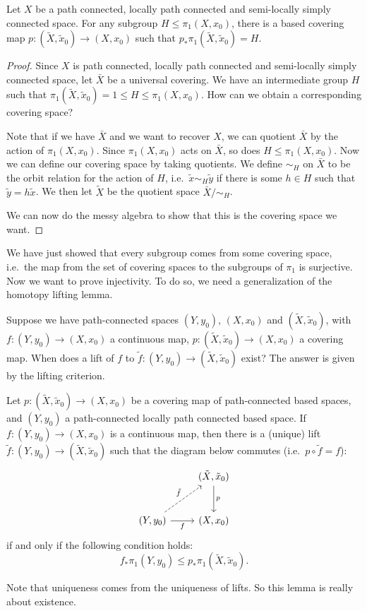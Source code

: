 \documentclass[a4paper]{article}
\begin{document}
\begin{prop}
  Let $X$ be a path connected, locally path connected and semi-locally simply connected space. For any subgroup $H \leq \pi_1(X, x_0)$, there is a based covering map $p: (\tilde{X}, \tilde{x}_0)\to (X, x_0)$ such that $p_* \pi_1(\tilde{X}, \tilde{x}_0) = H$.
\end{prop}

\begin{proof}
  Since $X$ is path connected, locally path connected and semi-locally simply connected space, let $\bar{X}$ be a universal covering. We have an intermediate group $H$ such that $\pi_1(\tilde{X}, \tilde{x}_0) = 1 \leq H \leq \pi_1(X, x_0)$. How can we obtain a corresponding covering space?

  Note that if we have $\bar{X}$ and we want to recover $X$, we can quotient $\bar{X}$ by the action of $\pi_1(X, x_0)$. Since $\pi_1(X, x_0)$ acts on $\bar{X}$, so does $H \leq \pi_1(X, x_0)$. Now we can define our covering space by taking quotients. We define $\sim_H$ on $\bar{X}$ to be the orbit relation for the action of $H$, i.e.\ $\tilde{x} \sim_H \tilde{y}$ if there is some $h \in H$ such that $\tilde{y} = h\tilde{x}$. We then let $\tilde{X}$ be the quotient space $\bar{X}/{\sim_H}$.

  We can now do the messy algebra to show that this is the covering space we want. %
\end{proof}
We have just showed that every subgroup comes from some covering space, i.e.\ the map from the set of covering spaces to the subgroups of $\pi_1$ is surjective. Now we want to prove injectivity. To do so, we need a generalization of the homotopy lifting lemma.

Suppose we have path-connected spaces $(Y, y_0)$, $(X, x_0)$ and $(\tilde{X}, \tilde{x}_0)$, with $f: (Y, y_0) \to (X, x_0)$ a continuous map, $p: (\tilde{X}, \tilde{x}_0) \to (X, x_0)$ a covering map. When does a lift of $f$ to $\tilde{f}: (Y, y_0) \to (\tilde{X}, \tilde{x}_0)$ exist? The answer is given by the lifting criterion.

\begin{lemma}
  Let $p: (\tilde{X}, \tilde{x}_0) \to (X, x_0)$ be a covering map of path-connected based spaces, and $(Y, y_0)$ a path-connected locally path connected based space. If $f: (Y, y_0) \to (X, x_0)$ is a continuous map, then there is a (unique) lift $\tilde{f}: (Y, y_0) \to (\tilde{X}, \tilde{x}_0)$ such that the diagram below commutes (i.e.\ $p\circ \tilde{f} = f$):
  \[
    \begin{tikzcd}[row sep=large]
      & (\tilde{X}, \tilde{x}_0) \ar[d, "p"]\\
      (Y, y_0) \ar [r, "f"'] \ar [ru, dashed, "\tilde{f}"] & (X, x_0)
    \end{tikzcd}
  \]
  if and only if the following condition holds:
  \[
    f_* \pi_1(Y, y_0) \leq p_*\pi_1(\tilde{X}, \tilde{x}_0).
  \]
\end{lemma}
Note that uniqueness comes from the uniqueness of lifts. So this lemma is really about existence.
\end{document}
